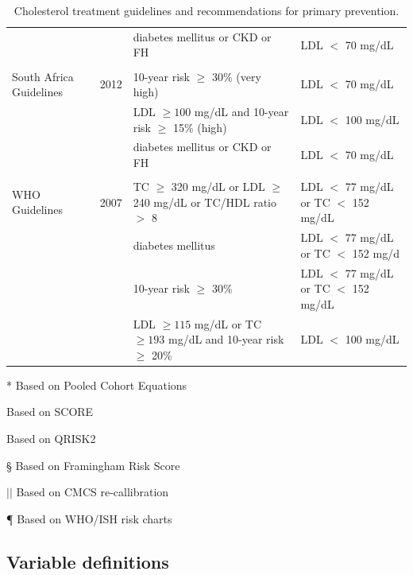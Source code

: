 \documentclass[12pt]{article}
\begin{document}
\begin{appendix}
\begin{table}[H]
{\begin{threeparttable}
\begin{tabular}{llll}
            & & diabetes mellitus or CKD or FH & LDL $<$ 70 mg/dL \\
            & & & \\
            South Africa Guidelines \cite{anderson_2012_2013} & 2012 & 10-year risk\tnote{\S} \hspace{1pt} $\geq$ 30\% (very high) & LDL $<$ 70 mg/dL \\
            & & LDL $\geq 100$ mg/dL and 10-year risk\tnote{\S} \hspace{1pt}  $\geq$ 15\% (high) & LDL $<$ 100 mg/dL \\
            & & diabetes mellitus or CKD or FH & LDL $<$ 70 mg/dL \\
            & & & \\
            WHO Guidelines \cite{anderson_2012_2013} & 2007 & TC $\geq$ 320 mg/dL or LDL $\geq$ 240 mg/dL or TC/HDL ratio $>$ 8 & LDL $<$ 77 mg/dL or TC $<$ 152 mg/dL \\
            & & diabetes mellitus & LDL $<$ 77 mg/dL or TC $<$ 152 mg/d  \\
            & & 10-year risk\tnote{\P} \hspace{1pt} $\geq$ 30\% & LDL $<$ 77 mg/dL or TC $<$ 152 mg/dL \\
            & & LDL $\geq 115$ mg/dL or TC $\geq 193$ mg/dL and 10-year risk\tnote{\P} \hspace{1pt}  $\geq$ 20\% & LDL $<$ 100 mg/dL \\
            \bottomrule
        \end{tabular}
        \begin{tablenotes}
            \item[*] Based on Pooled Cohort Equations
            \item[\textdagger] Based on SCORE
            \item[\ddag] Based on QRISK2
            \item[\S] Based on Framingham Risk Score
            \item[$||$] Based on CMCS re-callibration
            \item[\P] Based on WHO/ISH risk charts
        \end{tablenotes}
        \end{threeparttable}
        }
        \caption{Cholesterol treatment guidelines and recommendations for primary prevention.}
        \label{tab:guidelines}
    \end{table}

    \subsection{Variable definitions}


\end{appendix}
\end{document}
